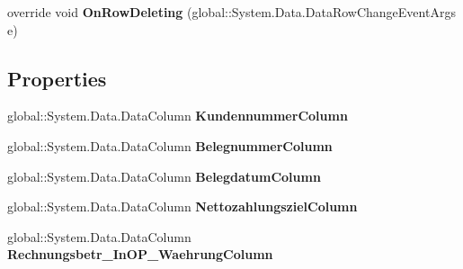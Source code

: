 \begin{DoxyCompactItemize}
\item 
override void {\bfseries On\+Row\+Deleting} (global\+::\+System.\+Data.\+Data\+Row\+Change\+Event\+Args e)\hypertarget{class_products_1_1_data_1_1ds_sage_1_1_op_debitoren_data_table_ab3bc18a586922e0a91da1e6543bdf8d3}{}\label{class_products_1_1_data_1_1ds_sage_1_1_op_debitoren_data_table_ab3bc18a586922e0a91da1e6543bdf8d3}

\end{DoxyCompactItemize}
\subsection*{Properties}
\begin{DoxyCompactItemize}
\item 
global\+::\+System.\+Data.\+Data\+Column {\bfseries Kundennummer\+Column}\hypertarget{class_products_1_1_data_1_1ds_sage_1_1_op_debitoren_data_table_ae31f47b8975f59ea0fcb96171bd537b3}{}\label{class_products_1_1_data_1_1ds_sage_1_1_op_debitoren_data_table_ae31f47b8975f59ea0fcb96171bd537b3}

\item 
global\+::\+System.\+Data.\+Data\+Column {\bfseries Belegnummer\+Column}\hypertarget{class_products_1_1_data_1_1ds_sage_1_1_op_debitoren_data_table_a5bc150b9561337d1319ae99409061cdd}{}\label{class_products_1_1_data_1_1ds_sage_1_1_op_debitoren_data_table_a5bc150b9561337d1319ae99409061cdd}

\item 
global\+::\+System.\+Data.\+Data\+Column {\bfseries Belegdatum\+Column}\hypertarget{class_products_1_1_data_1_1ds_sage_1_1_op_debitoren_data_table_a75d394721178abeff9676c7a878dcfa8}{}\label{class_products_1_1_data_1_1ds_sage_1_1_op_debitoren_data_table_a75d394721178abeff9676c7a878dcfa8}

\item 
global\+::\+System.\+Data.\+Data\+Column {\bfseries Nettozahlungsziel\+Column}\hypertarget{class_products_1_1_data_1_1ds_sage_1_1_op_debitoren_data_table_ae5de2f386a04779d7d0c484f02c46f6e}{}\label{class_products_1_1_data_1_1ds_sage_1_1_op_debitoren_data_table_ae5de2f386a04779d7d0c484f02c46f6e}

\item 
global\+::\+System.\+Data.\+Data\+Column {\bfseries Rechnungsbetr\+\_\+\+In\+O\+P\+\_\+\+Waehrung\+Column}\hypertarget{class_products_1_1_data_1_1ds_sage_1_1_op_debitoren_data_table_af235ee6ee03da68c54921c9c25756e7a}{}\label{class_products_1_1_data_1_1ds_sage_1_1_op_debitoren_data_table_af235ee6ee03da68c54921c9c25756e7a}


\end{DoxyCompactItemize}
